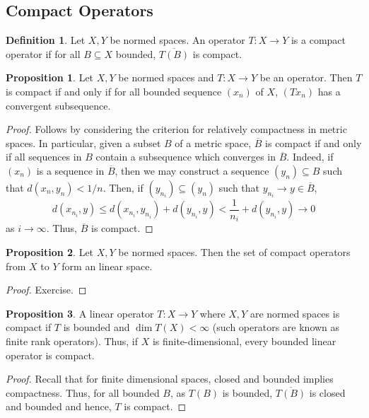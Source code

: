 \documentclass[]{article}
\theoremstyle{definition}
\theoremstyle{definition}
\newtheorem{definition}{Definition}[section]
\newtheorem{proposition}{Proposition}[section]
\begin{document}
\subsection{Compact Operators}

\begin{definition}
  Let \(X, Y\) be normed spaces. An operator \(T : X \to Y\) is a compact operator 
  if for all \(B \subseteq X\) bounded, \(\overline{T(B)}\) is compact.
\end{definition}

\begin{proposition}
  Let \(X, Y\) be normed spaces and \(T : X \to Y\) be an operator. Then 
  \(T\) is compact if and only if for all bounded sequence \((x_n)\) of 
  \(X\), \((Tx_n)\) has a convergent subsequence.
\end{proposition}
\begin{proof}
  Follows by considering the criterion for relatively compactness in metric 
  spaces. In particular, given a subset \(B\) of a metric space, 
  \(\overline{B}\) is compact if and only if all sequences in \(B\) contain a 
  subsequence which converges in \(\overline{B}\). Indeed, if \((x_n)\) is a 
  sequence in \(\overline{B}\), then we may construct a sequence \((y_n) 
  \subseteq B\) such that \(d(x_n, y_n) < 1 / n\). Then, if 
  \((y_{n_i}) \subseteq (y_n)\) such that \(y_{n_i} \to y \in \overline{B}\), 
  \[d(x_{n_i}, y) \le d(x_{n_i}, y_{n_i}) + d(y_{n_i}, y) < 
    \frac{1}{n_i} + d(y_{n_i}, y) \to 0\]
  as \(i \to \infty\). Thus, \(\overline{B}\) is compact.
\end{proof}

\begin{proposition}
  Let \(X, Y\) be normed spaces. Then the set of compact operators from \(X\) 
  to \(Y\) form an linear space.
\end{proposition}
\begin{proof}
  Exercise.
\end{proof}

\begin{proposition}
  A linear operator \(T : X \to Y\) where \(X, Y\) are normed spaces is compact 
  if \(T\) is bounded and \(\dim T(X) < \infty\) (such operators are known 
  as finite rank operators). Thus, if \(X\) is 
  finite-dimensional, every bounded linear operator is compact.
\end{proposition}
\begin{proof}
  Recall that for finite dimensional spaces, closed and bounded implies compactness. 
  Thus, for all bounded \(B\), as \(T(B)\) is bounded, \(\overline{T(B)}\) is 
  closed and bounded and hence, \(T\) is compact.
\end{proof}
\end{document}
